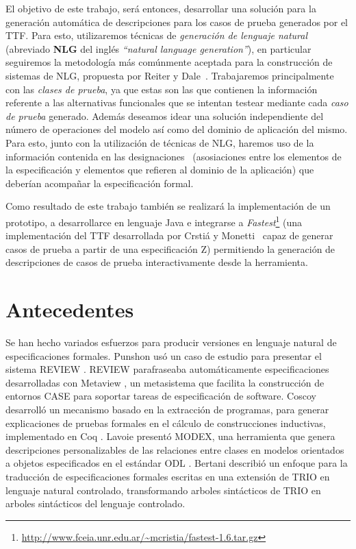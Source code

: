 El objetivo de este trabajo, será entonces, desarrollar una solución para la generación automática de descripciones para los casos de prueba generados por el TTF. Para esto, utilizaremos técnicas de \emph{generación de lenguaje natural} (abreviado \textbf{NLG} del inglés  \emph{``natural language generation''}), en particular seguiremos la metodología más comúnmente aceptada para la construcción de sistemas de NLG, propuesta por Reiter y Dale~\cite{reiter_dale}. Trabajaremos principalmente con las \emph{clases de prueba}, ya que estas son las que contienen la información referente a las alternativas funcionales que se intentan testear mediante cada \emph{caso de prueba} generado. Además deseamos idear una solución independiente del número de operaciones del modelo así como del dominio de aplicación del mismo. Para esto, junto con la utilización de técnicas de NLG, haremos uso de la información contenida en las designaciones~\cite{jackson} (asosiaciones entre los elementos de la especificación y elementos que refieren al dominio de la aplicación) que deberían acompañar la especificación formal. 


Como resultado de este trabajo también se realizará la implementación de un prototipo, a desarrollarce en lenguaje Java e integrarse a \emph{Fastest}\footnote{\url{http://www.fceia.unr.edu.ar/~mcristia/fastest-1.6.tar.gz}} (una implementación del TTF desarrollada por Crstiá y Monetti~\cite{fastest1} capaz de generar casos de prueba a partir de una especificación Z) permitiendo la generación de descripciones de casos de prueba interactivamente desde la herramienta. 

\section{Antecedentes}

Se han hecho variados esfuerzos para producir versiones en lenguaje natural de especificaciones formales. Punshon \cite{punshon} usó un caso de estudio para presentar el sistema REVIEW \cite{review}. REVIEW parafraseaba automáticamente especificaciones desarrolladas con Metaview \cite{metaview}, un metasistema que facilita la construcción de entornos CASE para soportar tareas de especificación de software. Coscoy \cite{coscoy} desarrolló un mecanismo basado en la extracción de programas, para generar explicaciones de pruebas formales en el cálculo de construcciones inductivas, implementado en Coq \cite{coq}. Lavoie \cite{lavoie} presentó MODEX, una herramienta que genera descripciones personalizables de las relaciones entre clases en modelos orientados a objetos especificados en el estándar ODL \cite{odl}. Bertani \cite{bertani} describió un enfoque para la traducción de especificaciones formales escritas en una extensión de TRIO \cite{trio} en lenguaje natural controlado, transformando arboles sintácticos de TRIO en arboles sintácticos del lenguaje controlado.  

